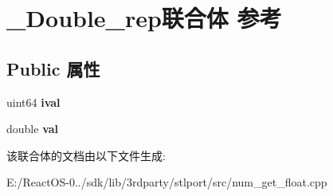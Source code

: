 \hypertarget{union___double__rep}{}\section{\+\_\+\+Double\+\_\+rep联合体 参考}
\label{union___double__rep}
\subsection*{Public 属性}
\begin{DoxyCompactItemize}
\item 
\mbox{\label{union___double__rep_ab6c6d0864011ca7ca25f378f87cf9112}} 
uint64 {\bfseries ival}
\item 
\mbox{\label{union___double__rep_ab469c7b5ac1c7b42c31d0ec41c09d85a}} 
double {\bfseries val}
\end{DoxyCompactItemize}


该联合体的文档由以下文件生成\+:\begin{DoxyCompactItemize}
\item 
E\+:/\+React\+O\+S-\/0../sdk/lib/3rdparty/stlport/src/num\+\_\+get\+\_\+float.\+cpp\end{DoxyCompactItemize}
